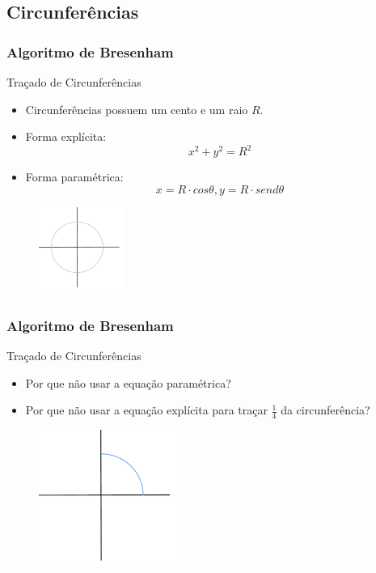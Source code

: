 \documentclass{beamer}
\begin{document}
\subsection{Circunferências}
\begin{frame}
\frametitle{Algoritmo de Bresenham}
		\begin{block}{Traçado de Circunferências}
		\begin{itemize}
			\item Circunferências possuem um cento e um raio $R$.
			\item Forma explícita:
				\begin{equation*}
					x^2+y^2 = R^2
				\end{equation*}
			\item Forma paramétrica:
				\begin{equation*}
					x = R \cdot cos \theta,y = R \cdot send \theta
				\end{equation*}
		\end{itemize}
	\end{block}
	\begin{figure}[!h]
			\begin{center}
			\includegraphics[width=0.25\textwidth]{Figures/Cir}
			\end{center}
		\end{figure}
\end{frame}


\begin{frame}
\frametitle{Algoritmo de Bresenham}
		\begin{block}{Traçado de Circunferências}
		\begin{itemize}
			\item Por que não usar a equação paramétrica?
			\item Por que não usar a equação explícita para traçar $\frac{1}{4}$ da circunferência?
		\end{itemize}
	\end{block}
	\begin{figure}[!h]
			\begin{center}
			\includegraphics[width=0.4\textwidth]{Figures/1-4Cir}
			\end{center}
		\end{figure}
\end{frame}
\end{document}
